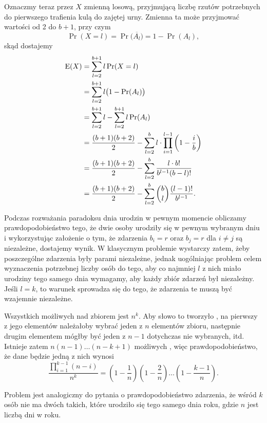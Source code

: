 Oznaczmy teraz przez $X$ zmienną losową, przyjmującą liczbę rzutów potrzebnych do pierwszego trafienia kulą do zajętej urny. Zmienna ta może przyjmować wartości od 2 do $b+1$, przy czym
\[
	\Pr(X=l) = \Pr\bigl(\overline{A_l}\bigr) = 1-\Pr(A_l),
\]
skąd dostajemy
\begin{align*}
	\operatorname{E}(X) &= \sum_{l=2}^{b+1}l\Pr(X=l) \\
	&= \sum_{l=2}^{b+1}l\bigl(1-\Pr(A_l)\bigr) \\
	&= \sum_{l=2}^{b+1}l-\sum_{l=2}^{b+1}l\Pr(A_l) \\
	&= \frac{(b+1)(b+2)}{2}-\sum_{l=2}^bl\cdot\prod_{i=1}^{l-1}\left(1-\frac{i}{b}\right) \\
	&= \frac{(b+1)(b+2)}{2}-\sum_{l=2}^b\frac{l\cdot b!}{b^{l-1}(b-l)!} \\
	&= \frac{(b+1)(b+2)}{2}-\sum_{l=2}^b\binom{b}{l}\frac{(l-1)!}{b^{l-1}}.
\end{align*}


\exercise{} %
Podczas rozważania paradoksu dnia urodzin w pewnym momencie obliczamy prawdopodobieństwo tego, że dwie osoby urodziły się w pewnym wybranym dniu i wykorzystując założenie o tym, że zdarzenia $b_i=r$ oraz $b_j=r$ dla $i\ne j$ są niezależne, dostajemy wynik. W klasycznym problemie wystarczy zatem, żeby poszczególne zdarzenia były parami niezależne, jednak uogólniając problem celem wyznaczenia potrzebnej liczby osób do tego, aby co najmniej $l$ z nich miało urodziny tego samego dnia wymagamy, aby każdy  zbiór zdarzeń był niezależny. Jeśli $l=k$, to warunek sprowadza się do tego, że zdarzenia te muszą być wzajemnie niezależne.

\exercise{} %
\exercise{} %
Wszystkich możliwych  nad zbiorem  jest $n^k$. Aby słowo to tworzyło , na pierwszy z jego elementów należałoby wybrać jeden z $n$ elementów zbioru, następnie drugim elementem mógłby być jeden z $n-1$ dotychczas nie wybranych, itd. Istnieje zatem $n(n-1)\dots(n-k+1)$ możliwych , więc prawdopodobieństwo, że dane  będzie jedną z nich wynosi
\[
	\frac{\prod_{i=1}^{k-1}(n-i)}{n^k} = \left(1-\frac{1}{n}\right)\left(1-\frac{2}{n}\right)\dots\left(1-\frac{k-1}{n}\right).
\]

Problem jest analogiczny do pytania o prawdopodobieństwo zdarzenia, że wśród $k$ osób nie ma dwóch takich, które urodziło się tego samego dnia roku, gdzie $n$ jest liczbą dni w roku.

